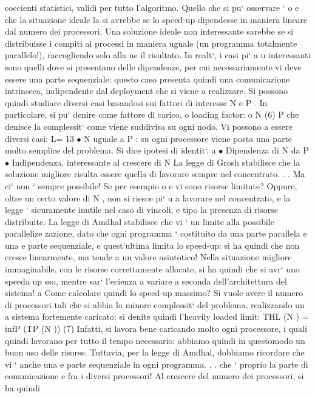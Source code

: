 \documentclass[a4paper,12pt]{article}
\begin{document}
coecienti statistici, validi per tutto l'algoritmo. Quello che si pu` osservare `
o
e
che la situazione ideale la si avrebbe se lo speed-up dipendesse in maniera lineare dal numero dei processori. Una
soluzione ideale non interessante sarebbe
se si distribuisse i compiti ai processi in maniera uguale (un programma totalmente parallelo!), raccogliendo solo alla
ne il risultato. In realt`, i casi pi`
a
u
interessanti sono quelli dove si presentano delle dipendenze, per cui necessariamente vi deve essere una parte
sequenziale: questo caso presenta quindi una
comunicazione intrinseca, indipendente dal deployment che si viene a realizzare.
Si possono quindi studiare diversi casi basandosi sui fattori di interesse N e
P . In particolare, si pu` denire come fattore di carico, o loading factor:
o
N
(6)
P
che denisce la complessit` come viene suddivisa su ogni nodo. Vi possono
a
essere diversi casi:
L=
13
\newpage
$\bullet$ N uguale a P : su ogni processore viene posta una parte molto semplice
del problema. Si dice ipotesi di identit`.
a
$\bullet$ Dipendenza di N da P
$\bullet$ Indipendenza, interessante al crescere di N
La legge di Grosh stabilisce che la soluzione migliore risulta essere quella di lavorare sempre nel concentrato. . . Ma
ci` non ` sempre possibile! Se per esempio
o
e
vi sono risorse limitate? Oppure, oltre un certo valore di N , non si riesce pi`
u
a lavorare nel concentrato, e la legge ` sicuramente inutile nel caso di vincoli,
e
tipo la presenza di risorse distribuite.
La legge di Amdhal stabilisce che vi ` un limite alla possibile parallelize
zazione, dato che ogni programma ` costituito da una parte parallela e una
e
parte sequenziale, e quest'ultima limita lo speed-up: si ha quindi che non cresce
linearmente, ma tende a un valore asintotico! Nella situazione migliore immaginabile, con le risorse correttamente
allocate, si ha quindi che si avr` uno speeda
up sso, mentre sar` l'ecienza a variare a seconda dell'architettura del sistema!
a
Come calcolare quindi lo speed-up massimo? Si vuole avere il numero di
processori tali che si abbia la minore complessit` del problema, realizzando un
a
sistema fortemente caricato: si denite quindi l'heavily loaded limit:
THL (N ) = infP (TP (N ))
(7)
Infatti, si lavora bene caricando molto ogni processore, i quali quindi lavorano
per tutto il tempo necessario: abbiamo quindi in questomodo un buon uso delle
risorse.
Tuttavia, per la legge di Amdhal, dobbiamo ricordare che vi ` anche una
e
parte sequenziale in ogni programma. . . che ` proprio la parte di comunicazione
e
fra i diversi processori! Al crescere del numero dei processori, si ha quindi
\end{document}
